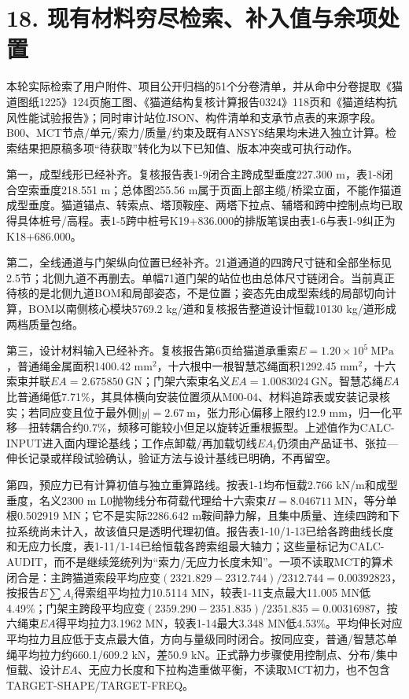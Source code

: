 \documentclass[UTF8,a4paper,11pt,fontset=none]{ctexart}
\begin{document}
\section*{18. 现有材料穷尽检索、补入值与余项处置}
本轮实际检索了用户附件、项目公开归档的51个分卷清单，并从命中分卷提取《猫道图纸1225》124页施工图、《猫道结构复核计算报告0324》118页和《猫道结构抗风性能试验报告》；同时审计站位JSON、构件清单和支承节点表的来源字段。B00、MCT节点/单元/索力/质量/约束及既有ANSYS结果均未进入独立计算。检索结果把原稿多项“待获取”转化为以下已知值、版本冲突或可执行动作。\par
第一，成型线形已经补齐。复核报告表1-9闭合主跨成型垂度227.300 m，表1-8闭合空索垂度218.551 m；总体图255.56 m属于页面上部主缆/桥梁立面，不能作猫道成型垂度。猫道锚点、转索点、塔顶鞍座、两塔下拉点、辅塔和跨中控制点均已取得具体桩号/高程。表1-5跨中桩号K19+836.000的排版笔误由表1-6与表1-9纠正为K18+686.000。\par
第二，全线通道与门架纵向位置已经补齐。21道通道的四跨尺寸链和全部坐标见2.5节；北侧九道不再删去。单幅71道门架的站位也由总体尺寸链闭合。当前真正待核的是北侧九道BOM和局部姿态，不是位置；姿态先由成型索线的局部切向计算，BOM以南侧核心模块5769.2 kg/道和复核报告整道设计恒载10130 kg/道形成两档质量包络。\par
第三，设计材料输入已经补齐。复核报告第6页给猫道承重索\(E=1.20\times10^5\ \mathrm{MPa}\)\allowbreak{}，普通绳金属面积1400.42 mm\(^2\)\allowbreak{}，十六根中一根智慧芯绳面积1292.45 mm\(^2\)\allowbreak{}，十六索束并联\(EA=2.675850\ \mathrm{GN}\)\allowbreak{}；门架六索束名义\(EA=1.0083024\ \mathrm{GN}\)\allowbreak{}。智慧芯绳\(EA\)\allowbreak{}比普通绳低7.71\%，其具体横向安装位置须从M00-04、材料追踪表或安装记录核实；若同应变且位于最外侧\(|y|=2.67\ \mathrm m\)\allowbreak{}，张力形心偏移上限约12.9 mm，归一化平移—扭转耦合约0.7\%，频移可能较小但足以旋转近重根振型。上述值作为CALC-INPUT进入面内理论基线；工作点卸载/再加载切线\(EA_t\)\allowbreak{}仍须由产品证书、张拉—伸长记录或样段试验确认，验证方法与设计基线已明确，不再留空。\par
第四，预应力已有计算初值与独立重算路线。按表1-1均布恒载2.766 kN/m和成型垂度，名义2300 m L0抛物线分布荷载代理给十六索束\(H=8.046711\ \mathrm{MN}\)\allowbreak{}，等分单根0.502919 MN；它不是实际2286.642 m鞍间静力解，且集中质量、连续四跨和下拉系统尚未计入，故该值只是透明代理初值。报告表1-10/1-13已给各跨曲线长度和无应力长度，表1-11/1-14已给恒载各跨索组最大轴力；这些量标记为CALC-AUDIT，而不是继续笼统列为“索力/无应力长度未知”。一项不读取MCT的算术闭合是：主跨猫道索段平均应变\((2321.829-2312.744)/2312.744=0.00392823\)\allowbreak{}，按报告\(E\sum A_i\)\allowbreak{}得索组平均拉力10.5114 MN，较表1-11支点最大11.005 MN低4.49\%；门架主跨段平均应变\((2359.290-2351.835)/2351.835=0.00316987\)\allowbreak{}，按六绳束\(EA\)\allowbreak{}得平均拉力3.1962 MN，较表1-14最大3.348 MN低4.53\%。平均伸长对应平均拉力且应低于支点最大值，方向与量级同时闭合。按同应变，普通/智慧芯单绳平均拉力约660.1/609.2 kN，差50.9 kN。正式静力步骤使用控制点、分布/集中恒载、设计\(EA\)\allowbreak{}、无应力长度和下拉构造重做平衡，不读取MCT初力，也不包含TARGET-SHAPE/TARGET-FREQ。\par
\end{document}
